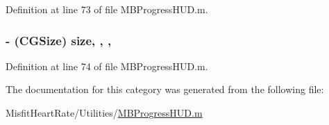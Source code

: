 Definition at line 73 of file M\+B\+Progress\+H\+U\+D.\+m.

\hypertarget{category_m_b_progress_h_u_d_07_08_aa7e6a57f64a0347bf480dc63ca6d2d35}{
\subsubsection[{size}]{\setlength{\rightskip}{0pt plus 5cm}-\/ (C\+G\+Size) size\hspace{0.3cm}{\ttfamily [read]}, {\ttfamily [write]}, {\ttfamily [atomic]}, {\ttfamily [assign]}}}\label{category_m_b_progress_h_u_d_07_08_aa7e6a57f64a0347bf480dc63ca6d2d35}


Definition at line 74 of file M\+B\+Progress\+H\+U\+D.\+m.



The documentation for this category was generated from the following file\+:\begin{DoxyCompactItemize}
\item 
Misfit\+Heart\+Rate/\+Utilities/\hyperlink{_m_b_progress_h_u_d_8m}{M\+B\+Progress\+H\+U\+D.\+m}\end{DoxyCompactItemize}
